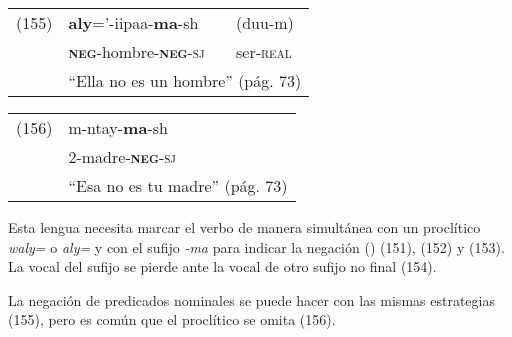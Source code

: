 {%
\begin{tabular}{lll}
(155) & \textbf{aly}='-iipaa-\textbf{ma}-sh & (duu-m) \\
& \textsc{\textbf{neg}}-hombre-\textsc{\textbf{neg}-sj} & ser-\textsc{real} \\
& \multicolumn{2}{l}{``Ella no es un hombre'' (pág. 73)}
\end{tabular} \vspace{0.5cm}

\begin{tabular}{ll}
(156) & m-ntay-\textbf{ma}-sh \\
& 2-madre-\textsc{\textbf{neg}-sj} \\
& ``Esa no es tu madre'' (pág. 73)
\end{tabular} \vspace{0.5cm}

}

Esta lengua necesita marcar el verbo de manera simultánea con un proclítico {\setmainfont{Charis SIL} \textit{waly=}} o {\setmainfont{Charis SIL} \textit{aly=}} y con el sufijo {\setmainfont{Charis SIL} \textit{-ma}} para indicar la negación (\textcolor{MidnightBlue}{\citep{maricopa}}) (151), (152) y (153). La vocal del sufijo se pierde ante la vocal de otro sufijo no final (154).

La negación de predicados nominales se puede hacer con las mismas estrategias (155), pero es común que el proclítico se omita (156).